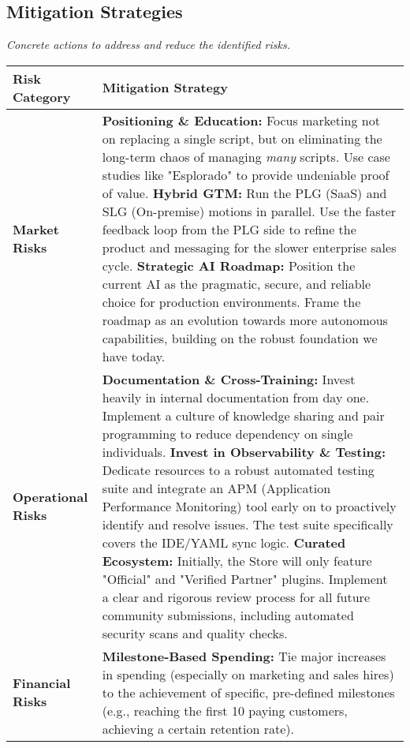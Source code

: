 \newpage
\subsection{Mitigation Strategies}
\textit{Concrete actions to address and reduce the identified risks.}

\begin{table}[H]
\centering
\begin{tabularx}{\textwidth}{@{}lL@{}}
\toprule
\textbf{Risk Category} & \textbf{Mitigation Strategy} \\
\midrule
\textbf{Market Risks} & 
\textbf{Positioning \& Education:} Focus marketing not on replacing a single script, but on eliminating the long-term chaos of managing \textit{many} scripts. Use case studies like "Esplorado" to provide undeniable proof of value. \newline\newline
\textbf{Hybrid GTM:} Run the PLG (SaaS) and SLG (On-premise) motions in parallel. Use the faster feedback loop from the PLG side to refine the product and messaging for the slower enterprise sales cycle. \newline\newline
\textbf{Strategic AI Roadmap:} Position the current AI as the pragmatic, secure, and reliable choice for production environments. Frame the roadmap as an evolution towards more autonomous capabilities, building on the robust foundation we have today. \\
\addlinespace
\textbf{Operational Risks} & 
\textbf{Documentation \& Cross-Training:} Invest heavily in internal documentation from day one. Implement a culture of knowledge sharing and pair programming to reduce dependency on single individuals. \newline\newline
\textbf{Invest in Observability \& Testing:} Dedicate resources to a robust automated testing suite and integrate an APM (Application Performance Monitoring) tool early on to proactively identify and resolve issues. The test suite specifically covers the IDE/YAML sync logic. \newline\newline
\textbf{Curated Ecosystem:} Initially, the Store will only feature "Official" and "Verified Partner" plugins. Implement a clear and rigorous review process for all future community submissions, including automated security scans and quality checks. \\
\addlinespace
\textbf{Financial Risks} & 
\textbf{Milestone-Based Spending:} Tie major increases in spending (especially on marketing and sales hires) to the achievement of specific, pre-defined milestones (e.g., reaching the first 10 paying customers, achieving a certain retention rate). \newline\newline

\end{tabularx}
\end{table}
